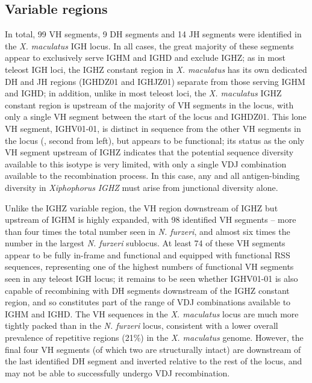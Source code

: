 	
	\subsection{Variable regions}
	
	In total, 99 VH segments, 9 DH segments and 14 JH segments were identified in the \textit{X. maculatus} IGH locus. In all cases, the great majority of these segments appear to exclusively serve IGHM and IGHD and exclude IGHZ; as in most teleost IGH loci, the IGHZ constant region in \textit{X. maculatus} has its own dedicated DH and JH regions (IGHDZ01 and IGHJZ01) separate from those serving IGHM and IGHD; %
in addition, unlike in most teleost loci, the \textit{X. maculatus} IGHZ constant region is upstream of the majority of VH segments in the locus, with only a single VH segment between the start of the locus and IGHDZ01. This lone VH segment, IGHV01-01, is distinct in sequence from the other VH segments in the locus (, second from left), but appears to be functional; its status as the only VH segment upstream of IGHZ indicates that the potential sequence diversity available to this isotype is very limited, with only a single VDJ combination available to the recombination process. In this case, any and all antigen-binding diversity in \textit{Xiphophorus} \textit{IGHZ} must arise from junctional diversity alone. 

	Unlike the IGHZ variable region, the VH region downstream of IGHZ but upstream of IGHM is highly expanded, with 98 identified VH segments -- more than four times the total number seen in \textit{N. furzeri}, and almost six times the number in the largest \textit{N. furzeri} sublocus. At least 74 of these VH segments appear to be fully in-frame and functional and equipped with functional RSS sequences, representing one of the highest numbers of functional VH segments seen in any teleost IGH locus; it remains to be seen whether IGHV01-01 is also capable of recombining with DH segments downstream of the IGHZ constant region, and so constitutes part of the range of VDJ combinations available to IGHM and IGHD. The VH sequences in the \textit{X. maculatus} locus are much more tightly packed than in the \textit{N. furzeri} locus, consistent with a lower overall prevalence of repetitive regions (21\%) in the \textit{X. maculatus} genome. However, the final four VH segments (of which two are structurally intact) are downstream of the last identified DH segment and inverted relative to the rest of the locus, and may not be able to successfully undergo VDJ recombination. 
	
